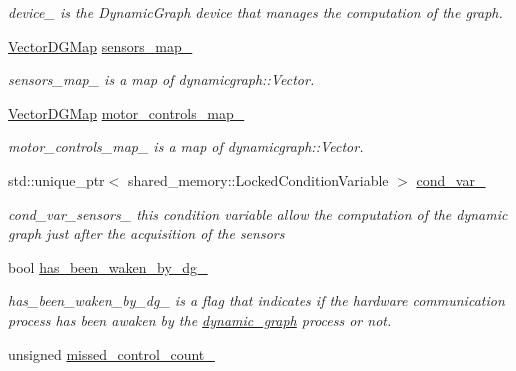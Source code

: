 \begin{DoxyCompactItemize}
\begin{DoxyCompactList}\small\item\em device\+\_\+ is the Dynamic\+Graph device that manages the computation of the graph. \end{DoxyCompactList}\item 
\hyperlink{namespacedynamic__graph_a51212ed7fa4ae81e7b362a27f09b7ab8}{Vector\+D\+G\+Map} \hyperlink{classdynamic__graph_1_1DynamicGraphManager_a896bf6cb22d2d88a5a6a307a2e44608e}{sensors\+\_\+map\+\_\+}
\begin{DoxyCompactList}\small\item\em sensors\+\_\+map\+\_\+ is a map of dynamicgraph\+::\+Vector. \end{DoxyCompactList}\item 
\hyperlink{namespacedynamic__graph_a51212ed7fa4ae81e7b362a27f09b7ab8}{Vector\+D\+G\+Map} \hyperlink{classdynamic__graph_1_1DynamicGraphManager_a03eabd2f08990a1dcc1caa652b701020}{motor\+\_\+controls\+\_\+map\+\_\+}
\begin{DoxyCompactList}\small\item\em motor\+\_\+controls\+\_\+map\+\_\+ is a map of dynamicgraph\+::\+Vector. \end{DoxyCompactList}\item 
std\+::unique\+\_\+ptr$<$ shared\+\_\+memory\+::\+Locked\+Condition\+Variable $>$ \hyperlink{classdynamic__graph_1_1DynamicGraphManager_a003d8598839c07a7d81c1afed0ea0b01}{cond\+\_\+var\+\_\+}\hypertarget{classdynamic__graph_1_1DynamicGraphManager_a003d8598839c07a7d81c1afed0ea0b01}{}\label{classdynamic__graph_1_1DynamicGraphManager_a003d8598839c07a7d81c1afed0ea0b01}

\begin{DoxyCompactList}\small\item\em cond\+\_\+var\+\_\+sensors\+\_\+ this condition variable allow the computation of the dynamic graph just after the acquisition of the sensors \end{DoxyCompactList}\item 
bool \hyperlink{classdynamic__graph_1_1DynamicGraphManager_a7e6cc5e58f1accce947f929d233a67fd}{has\+\_\+been\+\_\+waken\+\_\+by\+\_\+dg\+\_\+}\hypertarget{classdynamic__graph_1_1DynamicGraphManager_a7e6cc5e58f1accce947f929d233a67fd}{}\label{classdynamic__graph_1_1DynamicGraphManager_a7e6cc5e58f1accce947f929d233a67fd}

\begin{DoxyCompactList}\small\item\em has\+\_\+been\+\_\+waken\+\_\+by\+\_\+dg\+\_\+ is a flag that indicates if the hardware communication process has been awaken by the \hyperlink{namespacedynamic__graph}{dynamic\+\_\+graph} process or not. \end{DoxyCompactList}\item 
unsigned \hyperlink{classdynamic__graph_1_1DynamicGraphManager_abafc3cf4d8f7dc938f98b7eb07b7af9a}{missed\+\_\+control\+\_\+count\+\_\+}\hypertarget{classdynamic__graph_1_1DynamicGraphManager_abafc3cf4d8f7dc938f98b7eb07b7af9a}{}\label{classdynamic__graph_1_1DynamicGraphManager_abafc3cf4d8f7dc938f98b7eb07b7af9a}


\end{DoxyCompactItemize}
